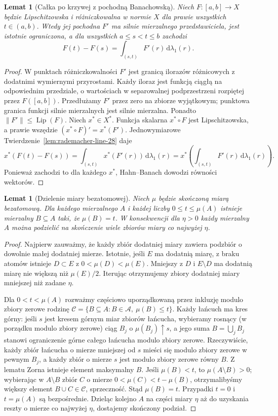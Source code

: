 \documentclass[11pt,a4paper,oneside]{book}
\numberwithin{equation}{chapter}
\theoremstyle{plain}
\newtheorem{lemat}[twierdzenie]{Lemat}
\theoremstyle{definition}
\theoremstyle{remark}
\begin{document}
\begin{lemat}[Całka po krzywej z pochodną Banachowską]
\label{lem:FTC-Banach-30}
Niech $F:[a,b]\to X$ będzie Lipschitzowska i
różniczkowalna w normie $X$ dla prawie wszystkich
$t\in(a,b)$. Wtedy jej pochodna $F'$ ma silnie
mierzalnego przedstawiciela, jest istotnie ograniczona,
a dla wszystkich $a\le s<t\le b$ zachodzi
\[
 F(t)-F(s)=\int_{(s,t)}F'(r)\,\mathrm d\lambda_1(r).
\]
\end{lemat}
\begin{proof}
W punktach różniczkowalności $F'$ jest granicą
ilorazów różnicowych z dodatnimi wymiernymi
przyrostami. Każdy iloraz jest funkcją ciągłą na
odpowiednim przedziale, o wartościach w separowalnej
podprzestrzeni rozpiętej przez $F([a,b])$.
Przedłużamy $F'$ przez zero na zbiorze wyjątkowym;
punktowa granica funkcji silnie mierzalnych jest
silnie mierzalna. Ponadto $\|F'\|\le\operatorname{Lip}(F)$.
Niech $x^*\in X^*$. Funkcja skalarna
$x^*\circ F$ jest Lipschitzowska, a prawie wszędzie
$(x^*\circ F)'=x^*(F')$. Jednowymiarowe
Twierdzenie~\ref{lem:rademacher-line-28} daje
\[
 x^*(F(t)-F(s))
 =\int_{(s,t)}x^*(F'(r))\,\mathrm d\lambda_1(r)
 =x^*\!\left(\int_{(s,t)}F'(r)\,\mathrm d\lambda_1(r)\right).
\]
Ponieważ zachodzi to dla każdego $x^*$,
Hahn--Banach dowodzi równości wektorów.
\end{proof}

\begin{lemat}[Dzielenie miary bezatomowej]
\label{lem:nonatomic-divisibility-30}
Niech $\mu$ będzie skończoną miarą bezatomową.
Dla każdego mierzalnego $A$ i każdej liczby
$0\le t\le\mu(A)$ istnieje mierzalny $B\subseteq A$
taki, że $\mu(B)=t$. W konsekwencji dla $\eta>0$
każdy mierzalny $A$ można podzielić na skończenie
wiele zbiorów miary co najwyżej $\eta$.
\end{lemat}
\begin{proof}
Najpierw zauważmy, że każdy zbiór dodatniej miary
zawiera podzbiór o dowolnie małej dodatniej mierze.
Istotnie, jeśli $E$ ma dodatnią miarę, z braku atomów
istnieje $D\subset E$ z $0<\mu(D)<\mu(E)$.
Mniejszy z $D$ i $E\setminus D$ ma dodatnią miarę
nie większą niż $\mu(E)/2$. Iterując otrzymujemy
zbiory dodatniej miary mniejszej niż zadane $\eta$.

Dla $0<t<\mu(A)$ rozważmy częściowo uporządkowaną
przez inkluzję modulo zbiory zerowe rodzinę
$\mathcal C=\{B\subseteq A:B\in\mathcal A,\ \mu(B)\le t\}$.
Każdy łańcuch ma kres górny: jeśli $s$ jest kresem
górnym miar zbiorów łańcucha, wybieramy rosnący
(w porządku modulo zbiory zerowe) ciąg $B_j$ o
$\mu(B_j)\uparrow s$, a jego suma $B=\bigcup_jB_j$
stanowi ograniczenie górne całego łańcucha modulo
zbiory zerowe. Rzeczywiście, każdy zbiór łańcucha
o mierze mniejszej od $s$ mieści się modulo zbiory
zerowe w pewnym $B_j$, a każdy zbiór o mierze $s$
jest modulo zbiory zerowe równy $B$.
Z lematu Zorna istnieje element maksymalny $B$.
Jeśli $\mu(B)<t$, to $\mu(A\setminus B)>0$;
wybierając w $A\setminus B$ zbiór $C$ o mierze
$0<\mu(C)<t-\mu(B)$, otrzymalibyśmy większy
element $B\cup C\in\mathcal C$, sprzeczność.
Stąd $\mu(B)=t$. Przypadki $t=0$ i $t=\mu(A)$
są bezpośrednie. Dzieląc kolejno $A$ na części
miary $\eta$ aż do uzyskania reszty o mierze
co najwyżej $\eta$, dostajemy skończony podział.
\end{proof}
\end{document}
